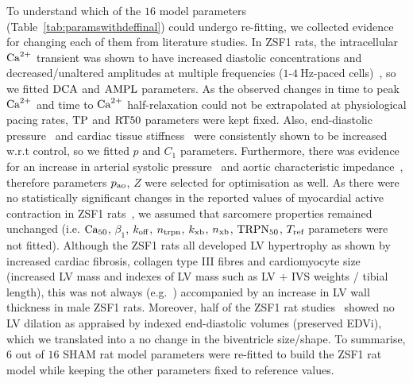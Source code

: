 \vspace{0.2cm}
To understand which of the $16$ model parameters (Table~\ref{tab:paramswithdeffinal}) could undergo re-fitting, we collected evidence for changing each of them from literature studies. In ZSF1 rats, the intracellular $\textrm{Ca}^{2+}$ transient was shown to have increased diastolic concentrations and decreased/unaltered amplitudes at multiple frequencies ($1$-$\SI{4}{\Hz}$-paced cells)~\cite{Miranda-Silva:2020, Abdellatif:2021}, so we fitted $\textrm{DCA}$ and $\textrm{AMPL}$ parameters. As the observed changes in time to peak $\textrm{Ca}^{2+}$ and time to $\textrm{Ca}^{2+}$ half-relaxation could not be extrapolated at physiological pacing rates, $\textrm{TP}$ and $\textrm{RT50}$ parameters were kept fixed. Also, end-diastolic pressure~\cite{Abdellatif:2016, Bowen:2017, Hamdani:2013, Hohendanner:2018, Lai:2016, Leite:2015, Leite:2015*a, Leite:2019, Salah:2018, Schmederer:2018} and cardiac tissue stiffness~\cite{Hamdani:2013, Abdellatif:2016, Van-Dijk:2016, Salah:2018, Schmederer:2018, Leite:2019, Davila:2019, Nguyen:2020} were consistently shown to be increased w.r.t control, so we fitted $p$ and $C_1$ parameters. Furthermore, there was evidence for an increase in arterial systolic pressure~\cite{Cuijpers:2020} and aortic characteristic impedance~\cite{Leite:2019}, therefore parameters $p_{\textrm{ao}}$, $Z$ were selected for optimisation as well. As there were no statistically significant changes in the reported values of myocardial active contraction in ZSF1 rats~\cite{Deel:2017, McCain:2014, Hersch:2013}, we assumed that sarcomere properties remained unchanged (i.e. $\textrm{Ca}_{50}$, $\beta_1$, $k_{\textrm{off}}$, $n_{\textrm{trpn}}$, $k_{\textrm{xb}}$, $n_{\textrm{xb}}$, $\textrm{TRPN}_{50}$, $T_{\textrm{ref}}$ parameters were not fitted). Although the ZSF1 rats all developed LV hypertrophy as shown by increased cardiac fibrosis, collagen type III fibres and cardiomyocyte size (increased LV mass and indexes of LV mass such as LV $+$ IVS weights / tibial length), this was not always (e.g.~\cite{Van-Dijk:2016, Schmederer:2018}) accompanied by an increase in LV wall thickness in male ZSF1 rats. Moreover, half of the ZSF1 rat studies~\cite{Hamdani:2013, Leite:2015, Leite:2015*a, Leite:2019, Abdellatif:2016, Lai:2016, Van-Dijk:2016, Nguyen:2020} showed no LV dilation as appraised by indexed end-diastolic volumes (preserved EDVi), which we translated into a no change in the biventricle size/shape. To summarise, $6$ out of $16$ SHAM rat model parameters were re-fitted to build the ZSF1 rat model while keeping the other parameters fixed to reference values.

